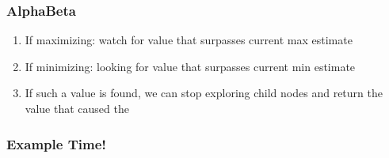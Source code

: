 \documentclass[presentation]{beamer}
\begin{document}
\begin{frame}
  \frametitle{AlphaBeta}
  \begin{enumerate}
  \item If maximizing: watch for value that surpasses current max
    estimate
  \item If minimizing: looking for value that surpasses current min
    estimate
  \item If such a value is found, we can stop exploring child nodes
    and return the value that caused the 
  \end{enumerate}
\end{frame}
\begin{frame}
  \frametitle{Example Time!}
\end{frame}
\end{document}
